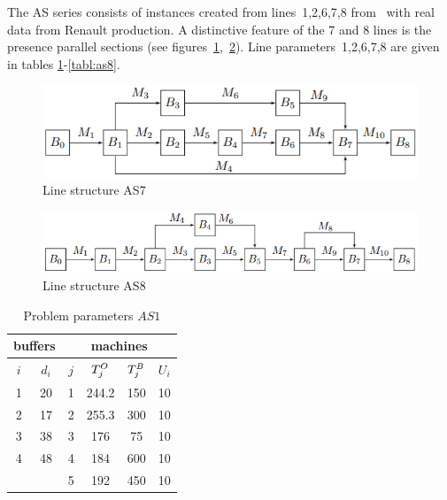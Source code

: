\documentclass{ifacconf}
\begin{document}
The AS series consists of instances created from lines~1,2,6,7,8 from~\cite{Ancelin1987} with real data from
Renault production.
A distinctive feature of the 7 and 8 lines is the presence
parallel sections (see figures~\ref{fig:vis_as7},~\ref{fig:vis_as8}).
Line parameters~1,2,6,7,8 are given in tables \ref{tabl:as1}-\ref{tabl:as8}.

 \begin{figure}[h!]
	\centering
	\includegraphics[scale=0.6]{ans7}
  \caption{Line structure AS7} \label{fig:vis_as7}
  \end{figure}

 \begin{figure}[h!]
	\centering
	\includegraphics[scale=0.55]{ans8}
  \caption{Line structure AS8} \label{fig:vis_as8}
  \end{figure}


\begin{table}[h!]
\centering
\small
\begin{tabular}{||c|c||c|c|c|c||}
\hline \multicolumn{2}{||c||}{buffers}&\multicolumn{4}{|c||}{machines}\\
\hline
$i$ & $d_i$ & $j$ & $T^{\rm O}_j$ & $T^{\rm B}_j$ & $U_i$\\
\hline
1 & 20 & 1 & 244.2 & 150 & 10\\
2 & 17 & 2 & 255.3 & 300 & 10\\
3 & 38 & 3 & 176 & 75 & 10\\
4 & 48 & 4 & 184 & 600 & 10\\
&& 5 & 192 & 450 & 10\\
\hline
\end{tabular}\\
\caption{Problem parameters $\textit{AS1}$}\label{tabl:as1}
\end{table}
\end{document}
